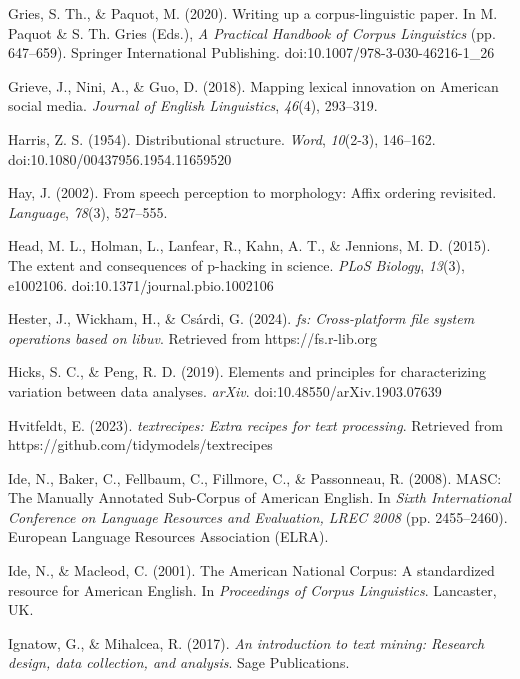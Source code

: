 \documentclass[
  letterpaper,
  krantz1]{latex/krantz-mod}
\newlength{\cslhangindent}
\newenvironment{CSLReferences}[2] %
 {\begin{list}{}{%
  \setlength{\itemindent}{0pt}
  \setlength{\leftmargin}{0pt}
  \setlength{\parsep}{0pt}
  \ifodd #1
   \setlength{\leftmargin}{\cslhangindent}
   \setlength{\itemindent}{-1\cslhangindent}
  \fi
  \setlength{\itemsep}{#2\baselineskip}}}
 {\end{list}}
\theoremstyle{definition}
\theoremstyle{definition}
\theoremstyle{remark}
\begin{document}
\begin{CSLReferences}{1}{0}
Gries, S. Th., \& Paquot, M. (2020). Writing up a corpus-linguistic
paper. In M. Paquot \& S. Th. Gries (Eds.), \emph{A {Practical Handbook}
of {Corpus Linguistics}} (pp. 647--659). Springer International
Publishing. doi:10.1007/978-3-030-46216-1\_26

Grieve, J., Nini, A., \& Guo, D. (2018). Mapping lexical innovation on
{American} social media. \emph{Journal of English Linguistics},
\emph{46}(4), 293--319.

Harris, Z. S. (1954). Distributional structure. \emph{Word},
\emph{10}(2-3), 146--162. doi:10.1080/00437956.1954.11659520

Hay, J. (2002). From speech perception to morphology: {Affix} ordering
revisited. \emph{Language}, \emph{78}(3), 527--555.

Head, M. L., Holman, L., Lanfear, R., Kahn, A. T., \& Jennions, M. D.
(2015). The extent and consequences of p-hacking in science. \emph{PLoS
Biology}, \emph{13}(3), e1002106. doi:10.1371/journal.pbio.1002106

Hester, J., Wickham, H., \& Csárdi, G. (2024). \emph{{fs}:
Cross-platform file system operations based on libuv}. Retrieved from
https://fs.r-lib.org

Hicks, S. C., \& Peng, R. D. (2019). Elements and principles for
characterizing variation between data analyses. \emph{arXiv}.
doi:10.48550/arXiv.1903.07639

Hvitfeldt, E. (2023). \emph{{textrecipes}: Extra recipes for text
processing}. Retrieved from https://github.com/tidymodels/textrecipes

Ide, N., Baker, C., Fellbaum, C., Fillmore, C., \& Passonneau, R.
(2008). {MASC}: {The Manually Annotated Sub-Corpus} of {American
English}. In \emph{Sixth {International Conference} on {Language
Resources} and {Evaluation}, {LREC} 2008} (pp. 2455--2460). European
Language Resources Association (ELRA).

Ide, N., \& Macleod, C. (2001). The {American National Corpus}: A
standardized resource for {American English}. In \emph{Proceedings of
{Corpus Linguistics}}. Lancaster, UK.

Ignatow, G., \& Mihalcea, R. (2017). \emph{An introduction to text
mining: {Research} design, data collection, and analysis}. Sage
Publications.


\end{CSLReferences}
\end{document}
